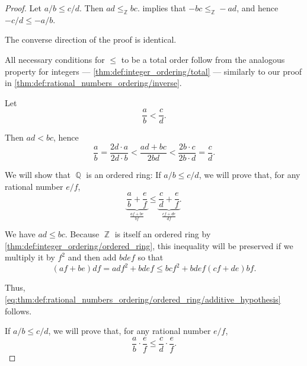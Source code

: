\begin{proof}
   Let \( a / b \leq c / d \). Then \( ad \leq_\BbbZ bc \).  implies that \( -bc \leq_\BbbZ -ad \), and hence \( -c / d \leq - a / b \).

  The converse direction of the proof is identical.

   All necessary conditions for \( \leq \) to be a total order follow from the analogous property for integers --- \cref{thm:def:integer_ordering/total} --- similarly to our proof in \cref{thm:def:rational_numbers_ordering/inverse}.

   Let
  \begin{equation*}
    \frac a b < \frac c d.
  \end{equation*}

  Then \( ad < bc \), hence
  \begin{equation*}
    \frac a b = \frac {2d \cdot a} {2d \cdot b} < \frac {ad + bc} {2bd} < \frac {2b \cdot c} {2b \cdot d} = \frac c d.
  \end{equation*}

   We will show that \( \BbbQ \) is an ordered ring:
   If \( a / b \leq c / d \), we will prove that, for any rational number \( e / f \),
  \begin{equation}\label{eq:thm:def:rational_numbers_ordering/ordered_ring/additive_hypothesis}
    \underbrace{\frac a b + \frac e f}_{\frac {af + be} {bf}} \leq \underbrace{\frac c d  + \frac e f}_{\frac {cf + de} {df}}.
  \end{equation}

  We have \( ad \leq bc \). Because \( \BbbZ \) is itself an ordered ring by \cref{thm:def:integer_ordering/ordered_ring}, this inequality will be preserved if we multiply it by \( f^2 \) and then add \( bdef \) so that
  \begin{equation*}
    (af + be) df = adf^2 + bdef \leq bcf^2 + bdef (cf + de) bf.
  \end{equation*}

  Thus, \eqref{eq:thm:def:rational_numbers_ordering/ordered_ring/additive_hypothesis} follows.

   If \( a / b \leq c / d \), we will prove that, for any rational number \( e / f \),
  \begin{equation}\label{eq:thm:def:rational_numbers_ordering/ordered_ring/multiplicative_hypothesis}
    \frac a b \cdot \frac e f \leq \frac c d \cdot \frac e f.
  \end{equation}


\end{proof}
